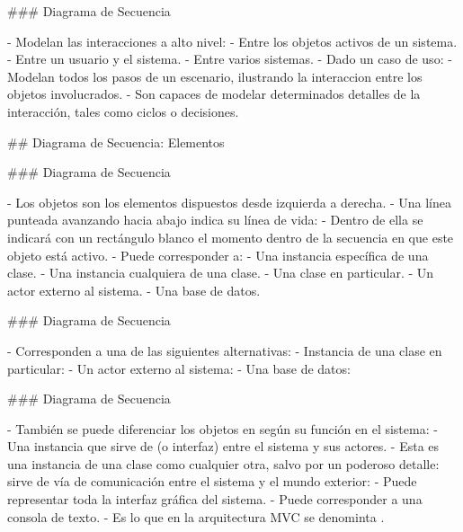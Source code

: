 ### Diagrama de Secuencia


- Modelan las interacciones a alto nivel:
    - Entre los objetos activos de un sistema.
    - Entre un usuario y el sistema.
    - Entre varios sistemas.
- Dado un caso de uso:
    - Modelan todos los pasos de un escenario, ilustrando la interaccion entre los
    objetos involucrados.
- Son capaces de modelar determinados detalles de la interacción, tales como ciclos
o decisiones.

## Diagrama de Secuencia: Elementos

### Diagrama de Secuencia


- Los objetos son los elementos dispuestos desde izquierda a derecha.
- Una línea punteada avanzando hacia abajo indica su línea de vida:
    - Dentro de ella se indicará con un rectángulo blanco el momento dentro de la
    secuencia en que este objeto está activo.
- Puede corresponder a:
    - Una instancia específica de una clase.
    - Una instancia cualquiera de una clase.
    - Una clase en particular.
    - Un actor externo al sistema.
    - Una base de datos.

### Diagrama de Secuencia


- Corresponden a una de las siguientes alternativas:
    - Instancia de una clase en particular:
\vspace{0.5em}
\vspace{0.5em}
    - Un actor externo al sistema:
\vspace{0.5em}
    - Una base de datos:

### Diagrama de Secuencia


- También se puede diferenciar los objetos en según su función en el sistema:
    - Una instancia que sirve de  (o interfaz) entre el sistema y sus actores.
    - Esta es una instancia de una clase como cualquier otra, salvo por un poderoso detalle:
    sirve de vía de comunicación entre el sistema y el mundo exterior:
        - Puede representar toda la interfaz gráfica del sistema.
        - Puede corresponder a una consola de texto.
        - Es lo que en la arquitectura MVC se denominta .

